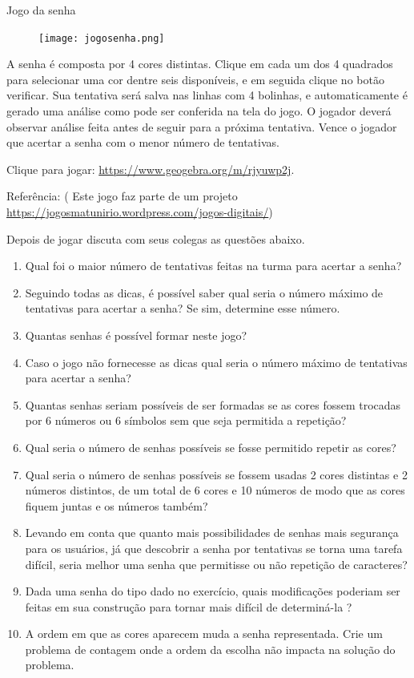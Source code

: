 \begin{task}{Jogo da senha}

\begin{figure}[H]
\centering

\texttt{[image: jogosenha.png]}
\end{figure}

A senha é composta por 4 cores distintas. Clique em cada um dos 4 quadrados para selecionar uma cor dentre seis disponíveis, e em seguida clique no botão verificar. Sua tentativa será salva nas linhas com 4 bolinhas, e automaticamente é gerado uma análise como pode ser conferida na tela do jogo. O jogador deverá observar análise feita antes de seguir para a próxima tentativa. Vence o jogador que acertar a senha com o menor número de tentativas.



Clique para jogar: \url{https://www.geogebra.org/m/rjyuwp2j}.



Referência: ( Este jogo faz parte de um projeto
\url{https://jogosmatunirio.wordpress.com/jogos-digitais/}) 



Depois de jogar discuta com seus colegas as questões abaixo. 

\begin{enumerate}

\item Qual foi o maior número de tentativas feitas na turma para acertar a senha? 
\item Seguindo todas as dicas, é possível saber qual seria o número máximo de tentativas para acertar a senha? Se sim, determine esse número.
\item Quantas senhas é possível formar neste jogo?
\item Caso o jogo não fornecesse as dicas qual seria o número máximo de tentativas para acertar a senha?
\item Quantas senhas seriam possíveis de ser formadas se as cores fossem trocadas por 6 números ou 6 símbolos sem que seja permitida a repetição?
\item Qual seria o número de senhas possíveis se fosse permitido repetir as cores?
\item Qual seria o número de senhas possíveis se fossem usadas 2 cores distintas e 2 números distintos, de um total de 6 cores e 10 números de modo que as cores fiquem juntas e os números também?
\item Levando em conta que quanto mais possibilidades de senhas mais segurança para os usuários, já que descobrir a senha por tentativas se torna uma tarefa difícil, seria melhor uma senha que permitisse ou não repetição de caracteres?

\item Dada uma senha do tipo dado no exercício, quais modificações poderiam ser feitas em sua construção para tornar mais difícil de determiná-la ?

\item A ordem em que as cores aparecem muda a senha representada. Crie um problema de contagem onde a ordem da escolha não impacta na solução do problema.
\end{enumerate}


\end{task}
